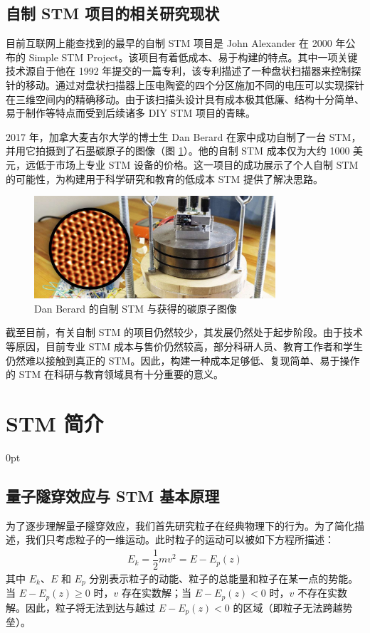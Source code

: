 \documentclass[zihao=-4]{ctexart}
\newcommand{\setParDis}{\setlength {\parskip} {0pt} }
\begin{document}
\begin{spacing}{1.5}
	\subsection{自制 STM 项目的相关研究现状}
		目前互联网上能查找到的最早的自制 STM 项目是 John Alexander 在 2000 年公布的 Simple STM Project\cite{ref12}。该项目有着低成本、易于构建的特点。其中一项关键技术源自于他在 1992 年提交的一篇专利，该专利描述了一种盘状扫描器来控制探针的移动。通过对盘状扫描器上压电陶瓷的四个分区施加不同的电压可以实现探针在三维空间内的精确移动\cite{ref13}。由于该扫描头设计具有成本极其低廉、结构十分简单、易于制作等特点而受到后续诸多 DIY STM 项目的青睐。
	
		2017 年，加拿大麦吉尔大学的博士生 Dan Berard 在家中成功自制了一台 STM，并用它拍摄到了石墨碳原子的图像（图 \ref{fig0}）\cite{ref11}。他的自制 STM 成本仅为大约 1000 美元，远低于市场上专业 STM 设备的价格。这一项目的成功展示了个人自制 STM 的可能性，为构建用于科学研究和教育的低成本 STM 提供了解决思路。
		
		\begin{figure}[!htbp]
			\centering
			\includegraphics[width=0.8\textwidth]{fig0.png}
			\caption{Dan Berard 的自制 STM 与获得的碳原子图像}
			\label{fig0}
		\end{figure}
		
		截至目前，有关自制 STM 的项目仍然较少，其发展仍然处于起步阶段。由于技术等原因，目前专业 STM 成本与售价仍然较高，部分科研人员、教育工作者和学生仍然难以接触到真正的 STM。因此，构建一种成本足够低、复现简单、易于操作的 STM 在科研与教育领域具有十分重要的意义。
		
		
		
		
		


\clearpage
\section{STM 简介}
	\setParDis %
	\subsection{量子隧穿效应与 STM 基本原理}
		为了逐步理解量子隧穿效应，我们首先研究粒子在经典物理下的行为。为了简化描述，我们只考虑粒子的一维运动。此时粒子的运动可以被如下方程所描述：
		\begin{align*}
			E_k = \dfrac{1}{2}mv^2 = E - E_p(z)
		\end{align*}
		其中 $E_k$、$E$ 和 $E_p$ 分别表示粒子的动能、粒子的总能量和粒子在某一点的势能。当 $E - E_p(z) \geq 0$ 时，$v$ 存在实数解；当 $E - E_p(z) < 0$ 时，$v$ 不存在实数解。因此，粒子将无法到达与越过 $E - E_p(z) < 0$ 的区域（即粒子无法跨越势垒）。
		

\end{spacing}
\end{document}
